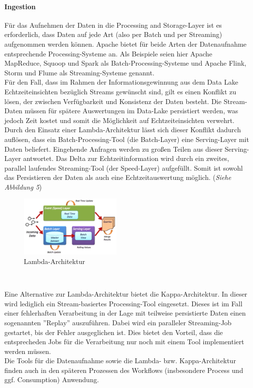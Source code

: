 \documentclass[twoside,twocolumn]{article}
\begin{document}
\paragraph{Ingestion}
		Für das Aufnehmen der Daten in die Processing and Storage-Layer ist es erforderlich, dass Daten auf jede Art (also per Batch und per Streaming) aufgenommen werden können. Apache bietet für beide Arten der Datenaufnahme entsprechende Processing-Systeme an. Als Beispiele seien hier Apache MapReduce, Squoop und Spark als Batch-Processing-Systeme und Apache Flink, Storm und Flume als Streaming-Systeme genannt.\cite{src8}\\
		Für den Fall, dass im Rahmen der Informationsgewinnung aus dem Data Lake Echtzeiteinsichten bezüglich Streams gewünscht sind, gilt es einen Konflikt zu lösen, der zwischen Verfügbarkeit und Konsistenz der Daten besteht. Die Stream-Daten müssen für spätere Auswertungen im Data-Lake persistiert werden, was jedoch Zeit kostet und somit die Möglichkeit auf Echtzeiteinsichten verwehrt. Durch den Einsatz einer Lambda-Architektur lässt sich dieser Konflikt dadurch auflösen, dass ein Batch-Processing-Tool (die Batch-Layer) eine Serving-Layer mit Daten beliefert. Eingehende Anfragen werden zu großen Teilen aus dieser Serving-Layer antwortet. Das Delta zur Echtzeitinformation wird durch ein zweites, parallel laufendes Streaming-Tool (der Speed-Layer) aufgefüllt. Somit ist sowohl das Persistieren der Daten als auch eine Echtzeitauswertung möglich. (\textit{Siehe Abbildung 5}) \cite{src10} 
		
		\begin{figure}[h]
			\centering 
			\includegraphics[width=0.45\textwidth]{img/lam} 
			\caption{Lambda-Architektur \cite{lam}}	
		\end{figure}\
		
		Eine Alternative zur Lambda-Architektur bietet die Kappa-Architektur. In dieser wird lediglich ein Stream-basiertes Processing-Tool eingesetzt. Dieses ist im Fall einer fehlerhaften Verarbeitung in der Lage mit teilweise persistierte Daten einen sogenannten ''Replay'' auszuführen. Dabei wird ein paralleler Streaming-Job gestartet, bis der Fehler ausgeglichen ist. Dies bietet den Vorteil, dass die entsprecheden Jobs für die Verarbeitung nur noch mit einem Tool implementiert werden müssen.\cite{src11} \\
		Die Tools für die Datenaufnahme sowie die Lambda- bzw. Kappa-Architektur finden auch in den späteren Prozessen des Workflows (insbesondere Process und ggf. Consumption) Anwendung.
		
\end{document}
